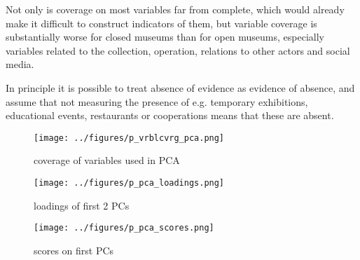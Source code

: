 \documentclass[12pt]{article}
\begin{document}
Not only is coverage on most variables far from complete, which would already make it difficult to construct indicators of them, but variable coverage is substantially worse for closed museums than for open museums, especially variables related to the collection, operation, relations to other actors and social media.

In principle it is possible to treat absence of evidence as evidence of absence, and assume that not measuring the presence of e.g. temporary exhibitions, educational events, restaurants or cooperations means that these are absent.


\begin{figure}[htbp]
\centering
\texttt{[image: ../figures/p\_vrblcvrg\_pca.png]}
\caption{\label{fig:p_vrblcvrg_pca}coverage of variables used in PCA}
\end{figure}

\begin{figure}[htbp]
\centering
\texttt{[image: ../figures/p\_pca\_loadings.png]}
\caption{\label{fig:p_pca_loadings}loadings of first 2 PCs}
\end{figure}

\begin{figure}[htbp]
\centering
\texttt{[image: ../figures/p\_pca\_scores.png]}
\caption{\label{fig:p_pca_scores}scores on first PCs}
\end{figure}
\end{document}
